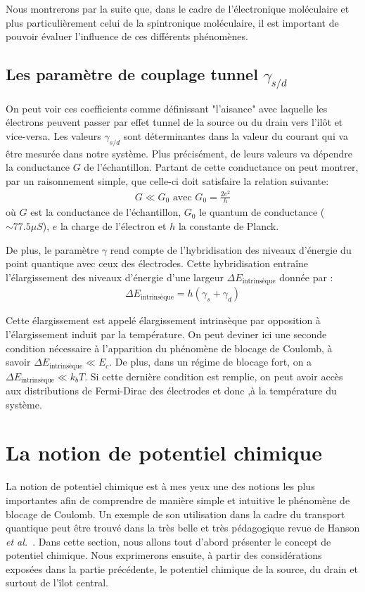 Nous montrerons par la suite que, dans le cadre de l'électronique moléculaire et plus particulièrement celui de la spintronique moléculaire, il est important de pouvoir évaluer l'influence de ces différents phénomènes.

\subsection{Les paramètre de couplage tunnel $\gamma_{s/d}$}

On peut voir ces coefficients comme définissant "l'aisance" avec laquelle les électrons peuvent passer par effet tunnel de la source ou du drain vers l'il\^ot et vice-versa. Les valeurs $\gamma_{s/d}$ sont déterminantes dans la valeur du courant qui va \^etre mesurée dans notre système. Plus précisément, de leurs valeurs va dépendre la conductance $G$ de l'échantillon. Partant de cette conductance on peut montrer, par un raisonnement simple, que celle-ci doit satisfaire la relation suivante:
\begin{eqnarray}
G \ll G_0 \text{ avec } G_0 = \frac{2e^2}{h}
\end{eqnarray}
où $G$ est la conductance de l'échantillon, $G_0$ le quantum de conductance ($\sim 77.5 \mu S$), $e$ la charge de l'électron et $h$ la constante de Planck.


De plus, le paramètre $\gamma$ rend compte de l'hybridisation des niveaux d'énergie du point quantique avec ceux des électrodes. Cette hybridisation entraîne l'élargissement des niveaux d'énergie d'une largeur $\Delta E_{\text{intrinsèque}}$ donnée par :
\begin{eqnarray}
\Delta E_{\text{intrinsèque}} = h (\gamma_s + \gamma_d)
\end{eqnarray}

Cette élargissement est appelé élargissement intrinsèque par opposition à l'élargissement induit par la température. On peut deviner ici une seconde condition nécessaire à l'apparition du phénomène de blocage de Coulomb, à savoir $\Delta E_{\text{intrinsèque}} \ll E_c$. De plus, dans un régime de blocage fort, on a $\Delta E_{\text{intrinsèque}} \ll k_bT$. Si cette dernière condition est remplie, on peut avoir accès aux distributions de Fermi-Dirac des électrodes et donc ,à la température du système.




\section{La notion de potentiel chimique}
La notion de potentiel chimique est à mes yeux une des notions les plus importantes afin de comprendre de manière simple et intuitive le phénomène de blocage de Coulomb. Un exemple de son utilisation dans la cadre du transport quantique peut \^etre trouvé dans la très belle et très pédagogique revue de Hanson \textit{et al.}~\cite{Hanson2007}. Dans cette section, nous allons tout d'abord présenter le concept de potentiel chimique. Nous exprimerons ensuite, à partir des considérations exposées dans la partie précédente, le potentiel chimique de la source, du drain et surtout de l'\^ilot central.

